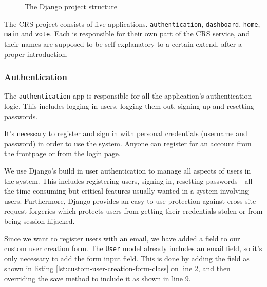 \begin{figure}[H]
    \caption{The Django project structure}
    \label{fig:project-structure}
\end{figure}

The CRS project consists of five applications. \texttt{authentication}, \texttt{dashboard}, \texttt{home}, \texttt{main} and \texttt{vote}. Each is responsible for their own part of the CRS service, and their names are supposed to be self explanatory to a certain extend, after a proper introduction.

\subsubsection*{Authentication}
The \texttt{authentication} app is responsible for all the application's authentication logic. This includes logging in users, logging them out, signing up and resetting passwords.

It's necessary to register and sign in with personal credentials (username and password) in order to use the system. Anyone can register for an account from the frontpage or from the login page.

We use Django's build in user authentication to manage all aspects of users in the system. This includes registering users, signing in, resetting passwords - all the time consuming but critical features usually wanted in a system involving users. Furthermore, Django provides an easy to use protection against cross site request forgeries which protects users from getting their credentials stolen or from being session hijacked.

Since we want to register users with an email, we have added a field to our custom user creation form. The \texttt{User} model already includes an email field, so it's only necessary to add the form input field. This is done by adding the field as shown in listing \ref{lst:custom-user-creation-form-class} on line 2, and then overriding the save method to include it as shown in line 9.


